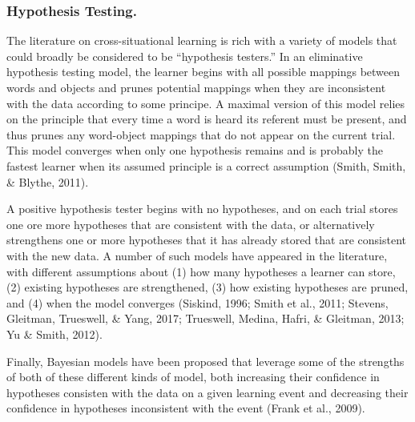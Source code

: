 \documentclass[english,,man,floatsintext]{apa6}
\begin{document}
\hypertarget{hypothesis-testing.}{%
\subsubsection{Hypothesis Testing.}\label{hypothesis-testing.}}

The literature on cross-situational learning is rich with a variety of models that could broadly be considered to be \enquote{hypothesis testers.} In an eliminative hypothesis testing model, the learner begins with all possible mappings between words and objects and prunes potential mappings when they are inconsistent with the data according to some principe. A maximal version of this model relies on the principle that every time a word is heard its referent must be present, and thus prunes any word-object mappings that do not appear on the current trial. This model converges when only one hypothesis remains and is probably the fastest learner when its assumed principle is a correct assumption (Smith, Smith, \& Blythe, 2011).

A positive hypothesis tester begins with no hypotheses, and on each trial stores one ore more hypotheses that are consistent with the data, or alternatively strengthens one or more hypotheses that it has already stored that are consistent with the new data. A number of such models have appeared in the literature, with different assumptions about (1) how many hypotheses a learner can store, (2) existing hypotheses are strengthened, (3) how existing hypotheses are pruned, and (4) when the model converges (Siskind, 1996; Smith et al., 2011; Stevens, Gleitman, Trueswell, \& Yang, 2017; Trueswell, Medina, Hafri, \& Gleitman, 2013; Yu \& Smith, 2012).

Finally, Bayesian models have been proposed that leverage some of the strengths of both of these different kinds of model, both increasing their confidence in hypotheses consisten with the data on a given learning event and decreasing their confidence in hypotheses inconsistent with the event (Frank et al., 2009).
\end{document}
